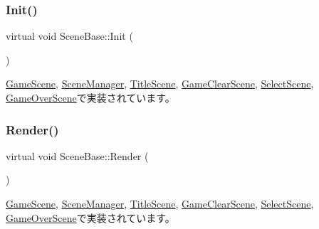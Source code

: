 \mbox{\label{class_scene_base_a24d7db43c819924dc8b07b436f6d3148}} 
\subsubsection{\texorpdfstring{Init()}{Init()}}
{\footnotesize\ttfamily virtual void Scene\+Base\+::\+Init (\begin{DoxyParamCaption}{ }\end{DoxyParamCaption})\hspace{0.3cm}{\ttfamily [pure virtual]}}



\mbox{\hyperlink{class_game_scene_a86227765def624b9b227db2aa41d9141}{Game\+Scene}}, \mbox{\hyperlink{class_scene_manager_a6c0e84d0e76f23fb3172839dba5f091b}{Scene\+Manager}}, \mbox{\hyperlink{class_title_scene_a3d039e7db0fa1e22e8c36d3cedfbd318}{Title\+Scene}}, \mbox{\hyperlink{class_game_clear_scene_a59fcf2b5d5d7197d37ecb85c54e7712a}{Game\+Clear\+Scene}}, \mbox{\hyperlink{class_select_scene_a20b3a902b5521d7494ed353731b3065d}{Select\+Scene}}, \mbox{\hyperlink{class_game_over_scene_a7382331efb2eda768c093f66395655d7}{Game\+Over\+Scene}}で実装されています。

\mbox{\label{class_scene_base_ad981674ce731ea267f398e889bbb9dc3}} 
\subsubsection{\texorpdfstring{Render()}{Render()}}
{\footnotesize\ttfamily virtual void Scene\+Base\+::\+Render (\begin{DoxyParamCaption}{ }\end{DoxyParamCaption})\hspace{0.3cm}{\ttfamily [pure virtual]}}



\mbox{\hyperlink{class_game_scene_ae5ecfa81aecd5e959b038142640a1c7b}{Game\+Scene}}, \mbox{\hyperlink{class_scene_manager_a968ae7a0065b793f139bda6bcc58d106}{Scene\+Manager}}, \mbox{\hyperlink{class_title_scene_af12c59b3bf9458640938c5ca620527ae}{Title\+Scene}}, \mbox{\hyperlink{class_game_clear_scene_addea514045f47860cfa23439b7bba075}{Game\+Clear\+Scene}}, \mbox{\hyperlink{class_select_scene_a85445536ad84d5232c724ecb7d48b8aa}{Select\+Scene}}, \mbox{\hyperlink{class_game_over_scene_a3fd3123c8660c25b01ca2f1e16615072}{Game\+Over\+Scene}}で実装されています。



